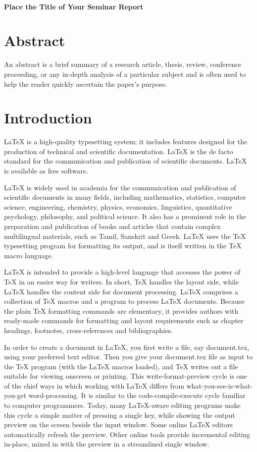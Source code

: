 \documentclass[11pt, a4paper]{article}
\newcommand{\Title}[1]{{\LARGE \centering \hrulefill\\ \textbf{#1}\\ \hrulefill}}
\begin{document}
\pagestyle{plain}



\onehalfspacing
\setcounter{page}{1}
\Title{Place the Title of Your Seminar Report}

\section*{Abstract}
{\small \singlespacing
	An abstract is a brief summary of a research article, thesis, review, conference proceeding,	or any in-depth analysis of a particular subject and is often used to help the reader quickly ascertain the paper's purpose.
}

\section{Introduction}\label{sec:intro}
LaTeX is a high-quality typesetting system; it includes features designed for the production of technical and scientific documentation. LaTeX is the de facto standard for the communication and publication of scientific documents. LaTeX is available as free software.

LaTeX is widely used in academia for the communication and publication of scientific documents in many fields, including mathematics, statistics, computer science, engineering, chemistry, physics, economics, linguistics, quantitative psychology, philosophy, and political science. It also has a prominent role in the preparation and publication of books and articles that contain complex multilingual materials, such as Tamil, Sanskrit and Greek. LaTeX uses the TeX typesetting program for formatting its output, and is itself written in the TeX macro language.

LaTeX is intended to provide a high-level language that accesses the power of TeX in an easier way for writers. In short, TeX handles the layout side, while LaTeX handles the content side for document processing. LaTeX comprises a collection of TeX macros and a program to process LaTeX documents. Because the plain TeX formatting commands are elementary, it provides authors with ready-made commands for formatting and layout requirements such as chapter headings, footnotes, cross-references and bibliographies.

In order to create a document in LaTeX, you first write a file, say document.tex, using your preferred text editor. Then you give your document.tex file as input to the TeX program (with the LaTeX macros loaded), and TeX writes out a file suitable for viewing onscreen or printing. This write-format-preview cycle is one of the chief ways in which working with LaTeX differs from what-you-see-is-what-you-get word-processing. It is similar to the code-compile-execute cycle familiar to computer programmers. Today, many LaTeX-aware editing programs make this cycle a simple matter of pressing a single key, while showing the output preview on the screen beside the input window. Some online LaTeX editors automatically refresh the preview. Other online tools provide incremental editing in-place, mixed in with the preview in a streamlined single window.
\end{document}
